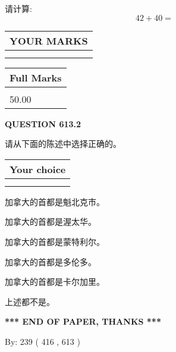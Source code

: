 \documentclass{ctexart}
\begin{document}
  
 
请计算:
\begin{equation}
42 +  %
40 = \nonumber
\end{equation}
 

 

 
  
\vspace{0.2in}
  
\noindent\begin{tabular}{|l|}
\hline
 YOUR MARKS  \\
\hline
 \\ 
 \\ 
\hline
\end{tabular}
\hspace{0.05in} \begin{tabular}{|l|}
\hline
 Full Marks  \\
\hline
 \\ 
50.00 \\
\hline
\end{tabular}
{\textbf{\Large{QUESTION
613.2 
}}}
  
  
请从下面的陈述中选择正确的。
  
  
\noindent\hspace{3.0in} \begin{tabular}{|l|}
\hline
Your choice \\
\hline
 \\ 
 \\ 
\hline
\end{tabular}
  
  
 
 
加拿大的首都是魁北克市。
 
 
加拿大的首都是渥太华。
 
 
加拿大的首都是蒙特利尔。
 
 
加拿大的首都是多伦多。
 
 
加拿大的首都是卡尔加里。
 
 
 上述都不是。
 
 
   
   
 \vspace{0.2in}
 
   
   
   
   
\vspace{1.0in} 
{\textbf{\large{ *** END OF PAPER, THANKS *** }}} 
   
   
\hspace{1.0in} By: 
 239 ( 416 ,  613 )
   
   
 
 
\end{document}
